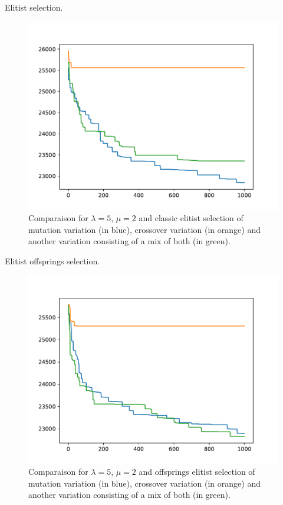 \documentclass{beamer}
\begin{document}
\begin{frame}
	Elitist selection.
\begin{figure}
\centering
\includegraphics[scale=.5]{../Plots/new/5,2,mutcmul,elitist.pdf}
\caption{Comparaison for $\lambda = 5$, $\mu = 2$ and classic elitist selection
of mutation variation (in blue), crossover variation (in orange)  and another
variation consisting of a mix of both (in green).}
\label{Elitistcomparevariation}
\end{figure}
\end{frame}

\begin{frame}
	Elitist offsprings selection.
\begin{figure}
\centering
\includegraphics[scale=.5]{../Plots/new/5,2,mutcmul,offsprings.pdf}
\caption{Comparaison for $\lambda = 5$, $\mu = 2$ and offsprings elitist
selection of mutation variation (in blue), crossover variation (in orange)  and
another variation consisting of a mix of both (in green).}
\label{Offspringscomparevariation}
\end{figure}
\end{frame}
\end{document}
